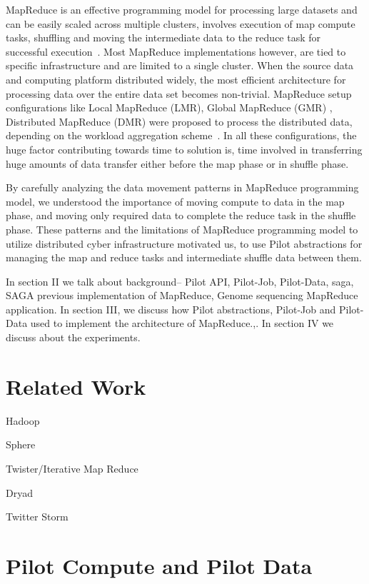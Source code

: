 \documentclass{acm_proc_article-sp}
\begin{document}
MapReduce is an effective programming model for processing large datasets and
can be easily scaled across multiple clusters, involves execution of map
compute tasks, shuffling and moving the intermediate data to the reduce task
for successful execution~\cite{Dean:2004:MSD:1251254.1251264}. Most MapReduce 
implementations however, are tied to
specific infrastructure and are limited to a single cluster. When the source
data and computing platform distributed widely, the most efficient
architecture for processing data over the entire data set becomes non-trivial.
MapReduce setup configurations like Local MapReduce (LMR), Global
MapReduce (GMR) , Distributed MapReduce (DMR) were proposed to process the
distributed data, depending on the workload aggregation
scheme~\cite{weissman-mr-11}. In all these configurations, the huge factor
contributing towards time to solution is, time involved in transferring huge
amounts of data transfer either before the map phase or in shuffle phase.

By carefully analyzing the data movement patterns in MapReduce programming
model, we understood the importance of moving compute to data in the map
phase, and moving only required data to complete the reduce task in the
shuffle phase. These patterns and the limitations of MapReduce programming
model to utilize distributed cyber infrastructure motivated us, to use Pilot
abstractions for managing the map and reduce tasks and intermediate shuffle
data between them.


In section II we talk about background-- Pilot API, Pilot-Job, Pilot-Data,
saga, SAGA previous implementation of MapReduce, Genome sequencing MapReduce
application. In section III, we discuss how Pilot abstractions, Pilot-Job and
Pilot-Data used to implement the architecture of MapReduce.,. In section IV we
discuss about the experiments.

\section{Related Work}

Hadoop

Sphere

Twister/Iterative Map Reduce~\cite{Ekanayake:2010:TRI:1851476.1851593}

Dryad

Twitter Storm

\section{Pilot Compute and Pilot Data}
\end{document}
